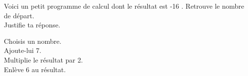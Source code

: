 %
%
	Voici un petit programme de calcul dont le résultat est -16 . Retrouve le nombre de départ. \\ Justifie ta réponse. \\
	\begin{center}
        \begin{minipage}{6cm}
        \begin{tcolorbox}
            Choisis un nombre. \\ Ajoute-lui 7. \\ Multiplie le résultat par 2. \\ Enlève 6 au résultat.
         \end{tcolorbox}
     \end{minipage}
    \end{center}
